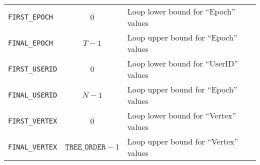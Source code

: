 \begin{tabular}{ l c l }
\texttt{FIRST\_EPOCH}  & \(                        0 \) & Loop lower bound for ``Epoch''  values \\
\texttt{FINAL\_EPOCH}  & \(                    T - 1 \) & Loop upper bound for ``Epoch''  values \\
\texttt{FIRST\_USERID} & \(                        0 \) & Loop lower bound for ``UserID'' values \\
\texttt{FINAL\_USERID} & \(                    N - 1 \) & Loop upper bound for ``Epoch''  values \\
\texttt{FIRST\_VERTEX} & \(                        0 \) & Loop lower bound for ``Vertex'' values \\
\texttt{FINAL\_VERTEX} & \( \mathtt{TREE\_ORDER} - 1 \) & Loop upper bound for ``Vertex'' values \\

\bottomrule

\end{tabular}
